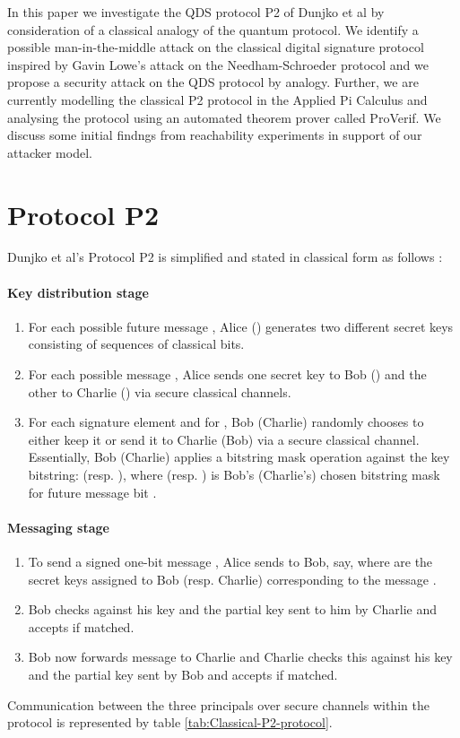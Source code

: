\documentclass[english]{article}
\begin{document}
In this paper we investigate the QDS protocol P2 of Dunjko et al by
consideration of a classical analogy of the quantum protocol. We identify
a possible man-in-the-middle attack on the classical digital signature
protocol inspired by Gavin Lowe's attack on the Needham-Schroeder
protocol \cite{Lowe1995} and we propose a security attack on the
QDS protocol by analogy. Further, we are currently modelling the classical
P2 protocol in the Applied Pi Calculus and analysing the protocol
using an automated theorem prover called ProVerif. We discuss some
initial findngs from reachability experiments in support of our attacker
model.


\section{Protocol P2}

Dunjko et al's Protocol P2 is simplified and stated in classical form
as follows \cite{Dunjko2014a}:


\paragraph{Key distribution stage}
\begin{enumerate}
\item For each possible future message , Alice () generates
two different secret keys consisting of sequences of classical bits.
\item For each possible message , Alice sends one secret key
to Bob () and the other to Charlie () via secure classical
channels.
\item For each signature element and for , Bob (Charlie) randomly
chooses to either keep it or send it to Charlie (Bob) via a secure
classical channel. Essentially, Bob (Charlie) applies a bitstring
mask operation against the key bitstring: 
(resp. ), where 
(resp. ) is Bob's (Charlie's) chosen bitstring mask for
future message bit .
\end{enumerate}

\paragraph*{Messaging stage}
\begin{enumerate}
\item To send a signed one-bit message , Alice sends 
to Bob, say, where  are the secret keys assigned to
Bob (resp. Charlie) corresponding to the message .
\item Bob checks  against his key and the
partial key sent to him by Charlie and accepts if matched.
\item Bob now forwards message  to Charlie
and Charlie checks this against his key and the partial key sent by
Bob and accepts if matched.
\end{enumerate}
Communication between the three principals over secure channels within
the protocol is represented by table \ref{tab:Classical-P2-protocol}.
\end{document}
